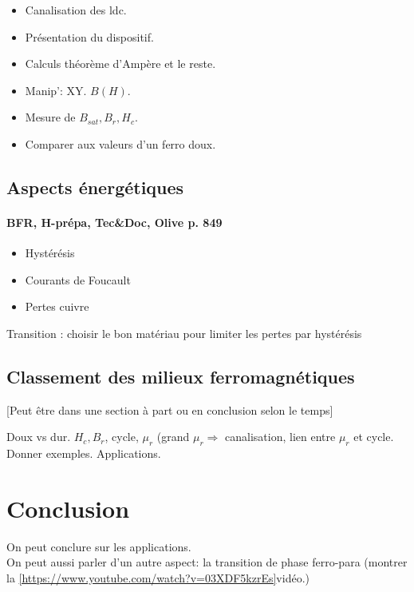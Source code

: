 \documentclass[11pt]{report}
\numberwithin{figure}{section}
\numberwithin{equation}{section}
\numberwithin{table}{section}
\newcommand{\1}{\boldsymbol{1}}
\begin{document}
\begin{itemize}
\item Canalisation des ldc.
\item Présentation du dispositif.
\item Calculs théorème d'Ampère et le reste.
\item Manip': XY. $B(H)$.
\item Mesure de $B_{sat}, B_r, H_c$.
\item Comparer aux valeurs d'un ferro doux.
\end{itemize}

\subsection{Aspects énergétiques}

\paragraph{BFR, H-prépa, Tec\&Doc, Olive p. 849}

\begin{itemize}
\item Hystérésis
\item Courants de Foucault
\item Pertes cuivre
\end{itemize}

Transition : choisir le bon matériau pour limiter les pertes par hystérésis

\subsection{Classement des milieux ferromagnétiques}

[Peut être dans une section à part ou en conclusion selon le temps]

Doux vs dur. $H_c, B_r$, cycle, $\mu_r$ (grand $\mu_r \Rightarrow$ canalisation, lien entre $\mu_r$ et cycle. \\
Donner exemples. Applications.

  
\section*{Conclusion}

On peut conclure sur les applications.\\
On peut aussi parler d'un autre aspect: la transition de phase ferro-para (montrer la \ref{https://www.youtube.com/watch?v=03XDF5kzrEs}{vidéo}.)
\end{document}
